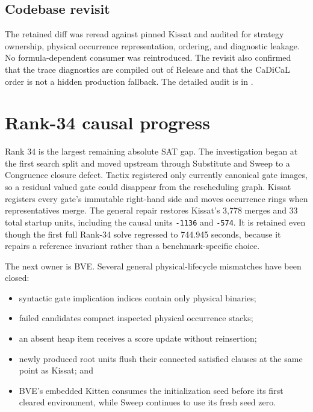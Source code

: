 \documentclass[11pt]{article}
\newcommand{\code}[1]{\texttt{#1}}
\begin{document}
\subsection{Codebase revisit}

The retained diff was reread against pinned Kissat and audited for strategy
ownership, physical occurrence representation, ordering, and diagnostic
leakage.  No formula-dependent consumer was reintroduced.  The revisit also
confirmed that the trace diagnostics are compiled out of Release and that the
CaDiCaL order is not a hidden production fallback.  The detailed audit is in
.

\section{Rank-34 causal progress}

Rank 34 is the largest remaining absolute SAT gap.  The investigation began at
the first search split and moved upstream through Substitute and Sweep to a
Congruence closure defect.  Tactix registered only currently canonical gate
images, so a residual valued gate could disappear from the rescheduling graph.
Kissat registers every gate's immutable right-hand side and moves occurrence
rings when representatives merge.  The general repair restores Kissat's 3,778
merges and 33 total startup units, including the causal units \code{-1136} and
\code{-574}.  It is retained even though the first full Rank-34 solve regressed
to 744.945 seconds, because it repairs a reference invariant rather than a
benchmark-specific choice.

The next owner is BVE.  Several general physical-lifecycle mismatches have been
closed:

\begin{itemize}
\item syntactic gate implication indices contain only physical binaries;
\item failed candidates compact inspected physical occurrence stacks;
\item an absent heap item receives a score update without reinsertion;
\item newly produced root units flush their connected satisfied clauses at the
  same point as Kissat; and
\item BVE's embedded Kitten consumes the initialization seed before its first
  cleared environment, while Sweep continues to use its fresh seed zero.
\end{itemize}
\end{document}
